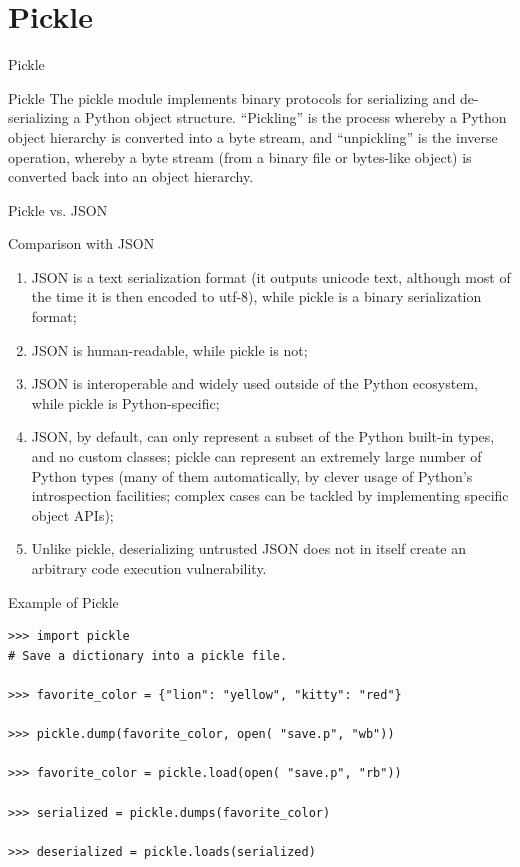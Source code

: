 \documentclass{beamer}
\begin{document}
\section{Pickle}
\begin{frame}[t]{Pickle}
    \begin{block}{Pickle}
The pickle module implements binary protocols for serializing and de-serializing a Python object structure. “Pickling” is the process whereby a Python object hierarchy is converted into a byte stream, and “unpickling” is the inverse operation, whereby a byte stream (from a binary file or bytes-like object) is converted back into an object hierarchy. 
    \end{block}
	\centering
\end{frame}
\begin{frame}[t]{Pickle vs. JSON}
	\begin{block}{Comparison with JSON}

		\begin{enumerate}
				\scriptsize
			\item JSON is a text serialization format (it outputs unicode text, although most of the time it is then encoded to utf-8), while pickle is a binary serialization format;

			\item JSON is human-readable, while pickle is not;

			\item JSON is interoperable and widely used outside of the Python ecosystem, while pickle is Python-specific;

			\item JSON, by default, can only represent a subset of the Python built-in types, and no custom classes; pickle can represent an extremely large number of Python types (many of them automatically, by clever usage of Python’s introspection facilities; complex cases can be tackled by implementing specific object APIs);

			\item Unlike pickle, deserializing untrusted JSON does not in itself create an arbitrary code execution vulnerability.
		\end{enumerate}
	\end{block}
\end{frame}

\begin{frame}[t,fragile]{Example of Pickle}

\scriptsize
\begin{verbatim}
>>> import pickle
# Save a dictionary into a pickle file.

>>> favorite_color = {"lion": "yellow", "kitty": "red"}

>>> pickle.dump(favorite_color, open( "save.p", "wb"))

>>> favorite_color = pickle.load(open( "save.p", "rb"))

>>> serialized = pickle.dumps(favorite_color)

>>> deserialized = pickle.loads(serialized)
\end{verbatim}
\end{frame}
\end{document}
